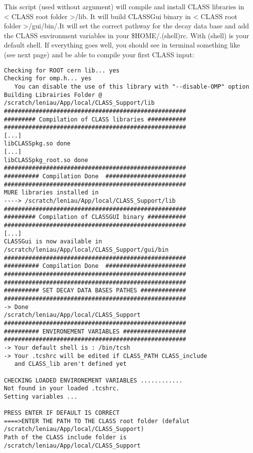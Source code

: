 This script (used without argument) will compile and install CLASS libraries in < CLASS root folder >/lib.
It will build CLASSGui binary in < CLASS root folder >/gui/bin/.It will set the correct pathway for the decay data base and add the CLASS environment variables in your \$HOME/.(shell)rc. With (shell) is your default shell. If everything goes well, you should see in terminal something like (see next page) and be able to compile your first CLASS input:
\begin{center}
\begin{minipage}{\textwidth}
\begin{lstlisting}[style=terminal]
Checking for ROOT cern lib... yes
Checking for omp.h... yes
   You can disable the use of this library with "--disable-OMP" option
Building Librairies Folder @ /scratch/leniau/App/local/CLASS_Support/lib
####################################################
######### Compilation of CLASS libraries ###########
####################################################
[...]
libCLASSpkg.so done
[...]
libCLASSpkg_root.so done
####################################################
########## Compilation Done  #######################
####################################################
MURE libraries installed in
----> /scratch/leniau/App/local/CLASS_Support/lib
####################################################
######### Compilation of CLASSGUI binary ###########
####################################################
[...]
CLASSGui is now available in /scratch/leniau/App/local/CLASS_Support/gui/bin 
####################################################
########## Compilation Done  #######################
####################################################
####################################################
########## SET DECAY DATA BASES PATHES #############
####################################################
-> Done
/scratch/leniau/App/local/CLASS_Support
####################################################
########## ENVIRONEMENT VARIABLES ##################
####################################################
-> Your default shell is : /bin/tcsh
-> Your .tcshrc will be edited if CLASS_PATH CLASS_include
   and CLASS_lib aren't defined yet 

CHECKING LOADED ENVIRONEMENT VARIABLES ............
Not found in your loaded .tcshrc. 
Setting variables ...

PRESS ENTER IF DEFAULT IS CORRECT
====>ENTER THE PATH TO THE CLASS root folder (defalut /scratch/leniau/App/local/CLASS_Support) 
Path of the CLASS include folder is /scratch/leniau/App/local/CLASS_Support


\end{lstlisting}
\end{minipage}
\end{center}
